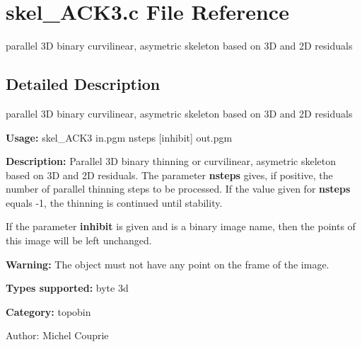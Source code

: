 \section{skel\_\-ACK3.c File Reference}
\label{skel__ACK3_8c}
parallel 3D binary curvilinear, asymetric skeleton based on 3D and 2D residuals  




\label{_details}
\subsection{Detailed Description}
parallel 3D binary curvilinear, asymetric skeleton based on 3D and 2D residuals 

{\bf Usage:} skel\_\-ACK3 in.pgm nsteps [inhibit] out.pgm

{\bf Description:} Parallel 3D binary thinning or curvilinear, asymetric skeleton based on 3D and 2D residuals. The parameter {\bf nsteps} gives, if positive, the number of parallel thinning steps to be processed. If the value given for {\bf nsteps} equals -1, the thinning is continued until stability.

If the parameter {\bf inhibit} is given and is a binary image name, then the points of this image will be left unchanged.

{\bf Warning:} The object must not have any point on the frame of the image.

{\bf Types supported:} byte 3d

{\bf Category:} topobin

\begin{Desc}
\item[Author:]Michel Couprie \end{Desc}
